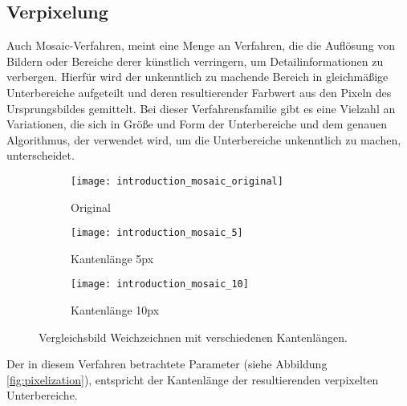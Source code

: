 \subsection{Verpixelung}
Auch Mosaic-Verfahren, meint eine Menge an Verfahren, die die Auflösung von Bildern oder Bereiche derer künstlich
verringern, um Detailinformationen zu verbergen. Hierfür wird der unkenntlich zu machende Bereich in gleichmäßige
Unterbereiche aufgeteilt und deren resultierender Farbwert aus den Pixeln des Ursprungsbildes gemittelt. Bei dieser
Verfahrensfamilie gibt es eine Vielzahl an Variationen, die sich in Größe und Form der Unterbereiche und dem genauen
Algorithmus, der verwendet wird, um die Unterbereiche unkenntlich zu machen, unterscheidet.

\begin{figure}[h]
    \centering
    \begin{subfigure}{0.3\textwidth}
        \texttt{[image: introduction\_mosaic\_original]}
        \caption{\small Original}
    \end{subfigure}
    \begin{subfigure}{0.3\textwidth}
        \texttt{[image: introduction\_mosaic\_5]}
        \caption{\small Kantenlänge 5px}
    \end{subfigure}
    \begin{subfigure}{0.3\textwidth}
        \texttt{[image: introduction\_mosaic\_10]}
        \caption{\small Kantenlänge 10px}
    \end{subfigure}

    \caption{Vergleichsbild Weichzeichnen mit verschiedenen Kantenlängen.}
    \label{fig:pixelization}
\end{figure}

Der in diesem Verfahren betrachtete Parameter (siehe Abbildung \space \vref*{fig:pixelization}), entspricht der Kantenlänge der
resultierenden verpixelten Unterbereiche.
